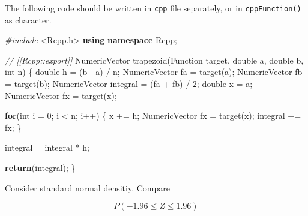 \documentclass[]{book}
\newenvironment{Shaded}{\begin{snugshade}}{\end{snugshade}}
\newcommand{\CommentTok}[1]{\textcolor[rgb]{0.56,0.35,0.01}{\textit{#1}}}
\newcommand{\ControlFlowTok}[1]{\textcolor[rgb]{0.13,0.29,0.53}{\textbf{#1}}}
\newcommand{\DataTypeTok}[1]{\textcolor[rgb]{0.13,0.29,0.53}{#1}}
\newcommand{\DecValTok}[1]{\textcolor[rgb]{0.00,0.00,0.81}{#1}}
\newcommand{\FloatTok}[1]{\textcolor[rgb]{0.00,0.00,0.81}{#1}}
\newcommand{\ImportTok}[1]{#1}
\newcommand{\KeywordTok}[1]{\textcolor[rgb]{0.13,0.29,0.53}{\textbf{#1}}}
\newcommand{\NormalTok}[1]{#1}
\newcommand{\OperatorTok}[1]{\textcolor[rgb]{0.81,0.36,0.00}{\textbf{#1}}}
\newcommand{\PreprocessorTok}[1]{\textcolor[rgb]{0.56,0.35,0.01}{\textit{#1}}}
\newcommand{\StringTok}[1]{\textcolor[rgb]{0.31,0.60,0.02}{#1}}
\theoremstyle{definition}
\theoremstyle{definition}
\theoremstyle{definition}
\theoremstyle{remark}
\begin{document}
The following code should be written in \texttt{cpp} file separately, or in \texttt{cppFunction()} as character.

\begin{Shaded}
\begin{Highlighting}[]
\PreprocessorTok{#include }\ImportTok{<Rcpp.h>}
\KeywordTok{using} \KeywordTok{namespace}\NormalTok{ Rcpp;}

\CommentTok{// [[Rcpp::export]]}
\NormalTok{NumericVector trapezoid(Function target, }\DataTypeTok{double}\NormalTok{ a, }\DataTypeTok{double}\NormalTok{ b, }\DataTypeTok{int}\NormalTok{ n) \{}
  \DataTypeTok{double}\NormalTok{ h = (b - a) / n;}
\NormalTok{  NumericVector fa = target(a);}
\NormalTok{  NumericVector fb = target(b);}
\NormalTok{  NumericVector integral = (fa + fb) / }\DecValTok{2}\NormalTok{;}
  \DataTypeTok{double}\NormalTok{ x = a;}
\NormalTok{  NumericVector fx = target(x);}
  
  \ControlFlowTok{for}\NormalTok{(}\DataTypeTok{int}\NormalTok{ i = }\DecValTok{0}\NormalTok{; i < n; i++) \{}
\NormalTok{    x += h;}
\NormalTok{    NumericVector fx = target(x);}
\NormalTok{    integral += fx;}
\NormalTok{  \}}
  
\NormalTok{  integral = integral * h;}
  
  \ControlFlowTok{return}\NormalTok{(integral);}
\NormalTok{\}}
\end{Highlighting}
\end{Shaded}

Consider standard normal densitiy. Compare

\[P(-1.96 \le Z \le 1.96)\]

\begin{Shaded}
\end{Shaded}
\end{document}
